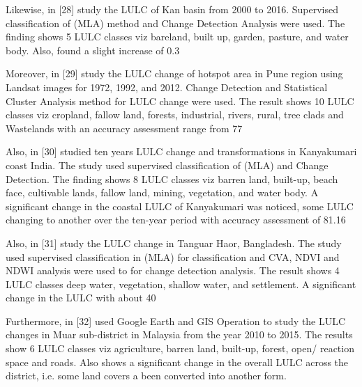 \documentclass[12pt,a4paper]{article}
\begin{document}
	Likewise, in [28] study the LULC of Kan basin from 2000 to 2016.	Supervised classification of (MLA) method and Change Detection	Analysis were used. The finding shows 5 LULC classes viz bareland, built up, garden, pasture, and water body. Also, found a	slight increase of 0.3%
	
	Moreover, in [29] study the LULC change of hotspot area in Pune	region using Landsat images for 1972, 1992, and 2012. Change	Detection and Statistical Cluster Analysis method for LULC	change were used. The result shows 10 LULC classes viz cropland,	fallow land, forests, industrial, rivers, rural, tree clads and Wastelands with an accuracy assessment range from 77%
	
	Also, in [30] studied ten years LULC change and transformations
	in Kanyakumari coast India. The study used supervised classification of (MLA) and Change Detection. The finding shows 8 LULC
	classes viz barren land, built-up, beach face, cultivable lands, fallow land, mining, vegetation, and water body. A significant	change in the coastal LULC of Kanyakumari was noticed, some	LULC changing to another over the ten-year period with accuracy	assessment of 81.16%
	
	Also, in [31] study the LULC change in Tanguar Haor, Bangladesh. The study used supervised classification in (MLA) for classification and CVA, NDVI and NDWI analysis were used to for	change detection analysis. The result shows 4 LULC classes deep water, vegetation, shallow water, and settlement. A significant change in the LULC with about 40%
	
	Furthermore, in [32] used Google Earth and GIS Operation to	study the LULC changes in Muar sub-district in Malaysia from
	the year 2010 to 2015. The results show 6 LULC classes viz agriculture, barren land, built-up, forest, open/ reaction space and	roads. Also shows a significant change in the overall LULC across	the district, i.e. some land covers a been converted into another	form.\\
	
\end{document}
